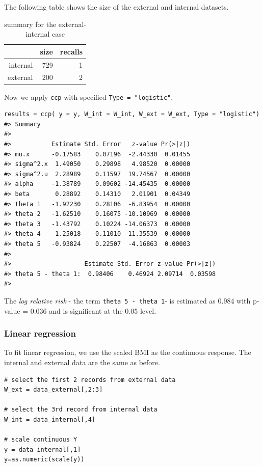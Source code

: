 \documentclass[15 pt,]{article}
\begin{document}
The following table shows the size of the external and internal
datasets.

\begin{table}[ht]
\centering
\begin{tabular}{rrr}
  \hline
 & size & recalls \\ 
  \hline
internal & 729 & 1 \\ 
  external & 200 & 2 \\ 
   \hline
\end{tabular}
\caption{summary for the external-internal case} 
\end{table}

Now we apply \texttt{ccp} with specified \texttt{Type\ =\ "logistic"}.

\begin{verbatim}
results = ccp( y = y, W_int = W_int, W_ext = W_ext, Type = "logistic")
#> Summary 
#>   
#>           Estimate Std. Error   z-value Pr(>|z|)
#> mu.x      -0.17583    0.07196  -2.44330  0.01455
#> sigma^2.x  1.49050    0.29898   4.98520  0.00000
#> sigma^2.u  2.28989    0.11597  19.74567  0.00000
#> alpha     -1.38789    0.09602 -14.45435  0.00000
#> beta       0.28892    0.14310   2.01901  0.04349
#> theta 1   -1.92230    0.28106  -6.83954  0.00000
#> theta 2   -1.62510    0.16075 -10.10969  0.00000
#> theta 3   -1.43792    0.10224 -14.06373  0.00000
#> theta 4   -1.25018    0.11010 -11.35539  0.00000
#> theta 5   -0.93824    0.22507  -4.16863  0.00003
#>   
#>                    Estimate Std. Error z-value Pr(>|z|)
#> theta 5 - theta 1:  0.98406    0.46924 2.09714  0.03598
#> 
\end{verbatim}

The \emph{log relative risk} - the term \texttt{theta\ 5\ -\ theta\ 1}-
is estimated as 0.984 with p-value = 0.036 and is significant at the
0.05 level.

\subsubsection{Linear regression}\label{linear-regression-1}

To fit linear regression, we use the scaled BMI as the continuous
response. The internal and external data are the same as before.

\begin{verbatim}
# select the first 2 records from external data
W_ext = data_external[,2:3]

# select the 3rd record from internal data
W_int = data_internal[,4]

# scale continuous Y
y = data_internal[,1]
y=as.numeric(scale(y))
\end{verbatim}
\end{document}
